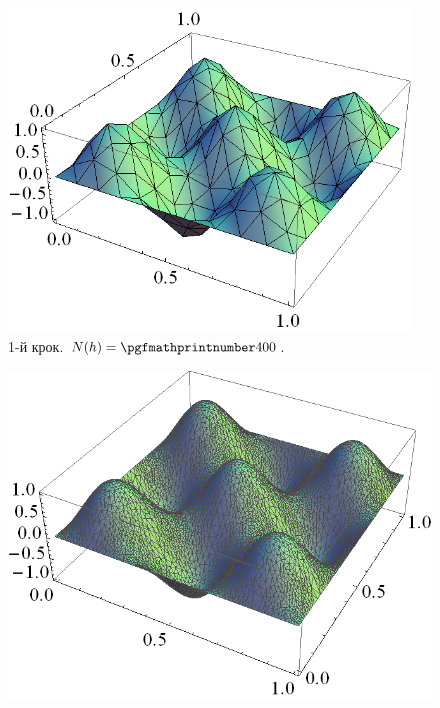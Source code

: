 \begin{frame}[allowframebreaks]
		\begin{figure}[H]
			 \begin{columns}
			 	\begin{column}{0.5\textwidth}
		     		\includegraphics[width=\textwidth]{problem1/my/solutions/1}
		     	\end{column}
		     	\begin{column}{0.3\textwidth}
		     		\caption*{1-й крок. $N(h) = \nn{400}$.}
		     	\end{column}
		     \end{columns}
		\end{figure}
		\begin{figure}[H]
			\begin{columns}
			 	\begin{column}{0.7\textwidth}
			 		\includegraphics[width=\textwidth]{problem1/my/solutions/5}

\end{column}
\end{columns}
\end{figure}
\end{frame}
